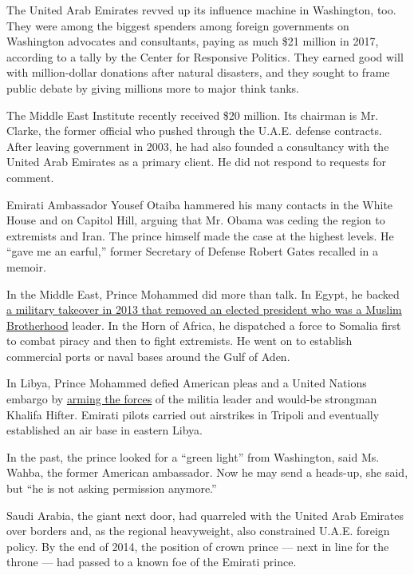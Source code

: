 The United Arab Emirates revved up its influence machine in Washington,
too. They were among the biggest spenders among foreign governments on
Washington advocates and consultants, paying as much \$21 million in
2017, according to a tally by the Center for Responsive Politics. They
earned good will with million-dollar donations after natural disasters,
and they sought to frame public debate by giving millions more to major
think tanks.

The Middle East Institute recently received \$20 million. Its chairman
is Mr. Clarke, the former official who pushed through the U.A.E. defense
contracts. After leaving government in 2003, he had also founded a
consultancy with the United Arab Emirates as a primary client. He did
not respond to requests for comment.

Emirati Ambassador Yousef Otaiba hammered his many contacts in the White
House and on Capitol Hill, arguing that Mr. Obama was ceding the region
to extremists and Iran. The prince himself made the case at the highest
levels. He ``gave me an earful,'' former Secretary of Defense Robert
Gates recalled in a memoir.

In the Middle East, Prince Mohammed did more than talk. In Egypt, he
backed
\href{https://www.nytimes.com/2018/07/27/sunday-review/obama-egypt-coup-trump.html}{a
military takeover in 2013 that removed an elected president who was a
Muslim Brotherhood} leader. In the Horn of Africa, he dispatched a force
to Somalia first to combat piracy and then to fight extremists. He went
on to establish commercial ports or naval bases around the Gulf of Aden.

In Libya, Prince Mohammed defied American pleas and a United Nations
embargo by
\href{https://www.nytimes.com/2015/11/13/world/middleeast/leaked-emirati-emails-could-threaten-peace-talks-in-libya.html}{arming
the forces} of the militia leader and would-be strongman Khalifa Hifter.
Emirati pilots carried out airstrikes in Tripoli and eventually
established an air base in eastern Libya.

In the past, the prince looked for a ``green light'' from Washington,
said Ms. Wahba, the former American ambassador. Now he may send a
heads-up, she said, but ``he is not asking permission anymore.''

Saudi Arabia, the giant next door, had quarreled with the United Arab
Emirates over borders and, as the regional heavyweight, also constrained
U.A.E. foreign policy. By the end of 2014, the position of crown prince
--- next in line for the throne --- had passed to a known foe of the
Emirati prince.

